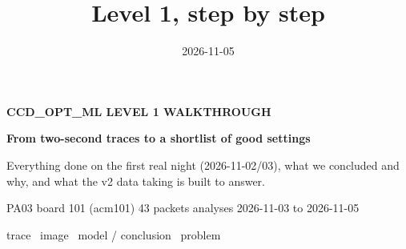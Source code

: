 \documentclass[aspectratio=169,11pt]{beamer}
\title{Level 1, step by step}
\date{2026-11-05}
\begin{document}
{
\begin{frame}[plain]
\vfill
{\color{trace!60}\small\bfseries CCD\_OPT\_ML \textperiodcentered{} LEVEL 1 \textperiodcentered{} WALKTHROUGH}\par\vspace{0.8em}
{\color{paper}\LARGE\bfseries From two-second traces to a shortlist of good settings}\par\vspace{1em}
{\color{paper!80}\normalsize Everything done on the first real night (2026-11-02/03), what we concluded and why, and what the v2 data taking is built to answer.}\par\vfill
{\color{paper!70}\small PA03 \textperiodcentered{} board 101 (acm101) \textperiodcentered{} 43 packets \textperiodcentered{} analyses 2026-11-03 to 2026-11-05}\par\vspace{0.5em}
{\small\colorbox{trace}{\color{paper} trace}\ \colorbox{image}{\color{paper} image}\ \colorbox{model}{\color{paper} model / conclusion}\ \colorbox{problem}{\color{paper} problem}}
\end{frame}}

\end{document}

